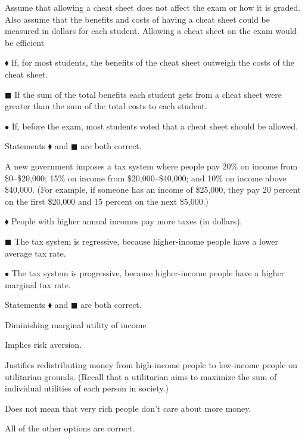 \documentclass[12pt]{article}
\newcommand{\question}[1]{%
  \Needspace{9\baselineskip}%
  \item #1%
  \vspace{-0.45em}  %
}
\begin{document}
\begin{questions}
  \question{Assume that allowing a cheat sheet does not affect the exam or how it is graded. Also assume that the benefits and costs of having a cheat sheet could be measured in dollars for each student. Allowing a cheat sheet on the exam would be efficient}
  \begin{choices}
    \item \(\blacklozenge\) If, for most students, the benefits of the cheat sheet outweigh the costs of the cheat sheet.
    \item \(\blacksquare\) If the sum of the total benefits each student gets from a cheat sheet were greater than the sum of the total costs to each student.
    \item \(\bullet\) If, before the exam, most students voted that a cheat sheet should be allowed.
    \item Statements \(\blacklozenge\) and \(\blacksquare\) are both correct.
  \end{choices}


  \question{A new government imposes a tax system where people pay 20\% on income from \$0–\$20,000; 15\% on income from \$20,000–\$40,000; and 10\% on income above \$40,000. (For example, if someone has an income of \$25,000, they pay 20 percent on the first \$20,000 and 15 percent on the next \$5,000.)}
  \begin{choices}
    \item \(\blacklozenge\) People with higher annual incomes pay more taxes (in dollars).
    \item \(\blacksquare\) The tax system is regressive, because higher-income people have a lower average tax rate.
    \item \(\bullet\) The tax system is progressive, because higher-income people have a higher marginal tax rate.
    \item Statements \(\blacklozenge\) and \(\blacksquare\) are both correct.
  \end{choices}


  \question{Diminishing marginal utility of income}
  \begin{choices}
    \item Implies risk aversion.
    \item Justifies redistributing money from high-income people to low-income people on utilitarian grounds. (Recall that a utilitarian aims to maximize the sum of individual utilities of each person in society.)
    \item Does not mean that very rich people don’t care about more money.
    \item All of the other options are correct.
  \end{choices}



\end{questions}
\end{document}
